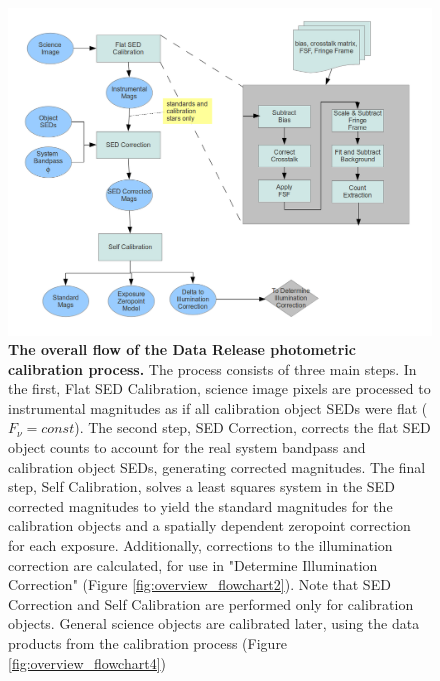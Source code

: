 \documentclass[12pt,preprint]{aastex}
\begin{document}
\begin{figure}[htbp]
\includegraphics[width=6.5in]{CalibDataProdSchematic1}
\caption{ {\small {\bf The overall flow of the Data Release photometric
      calibration process.} The process consists of three main steps.  In the first, Flat SED Calibration, science image pixels are processed to instrumental magnitudes as if all calibration object SEDs were flat ($F_{\nu} = const$).  The second step, SED Correction, corrects the flat SED object counts to account for the real system bandpass and calibration object SEDs, generating corrected magnitudes.  The final step, Self Calibration, solves a least squares system in the SED corrected magnitudes to yield the standard magnitudes for the calibration objects and a spatially dependent zeropoint correction for each exposure.   Additionally, corrections to the illumination correction are calculated, for use in "Determine Illumination Correction" (Figure \ref{fig:overview_flowchart2}).  Note that SED Correction and Self Calibration are performed only for calibration objects.  General science objects are calibrated later, using the data products from the calibration process (Figure \ref{fig:overview_flowchart4}) }
\label{fig:overview_flowchart1} }
\end{figure}
\end{document}
